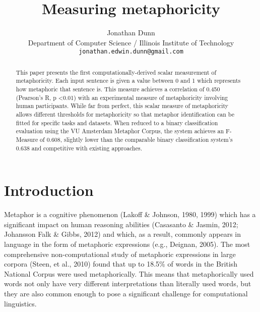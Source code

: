 \documentclass[11pt]{article}
\title{Measuring metaphoricity}
\author{Jonathan Dunn \\
Department of Computer Science / Illinois Institute of Technology \\
  {\tt jonathan.edwin.dunn@gmail.com} \\}
\date{}
\begin{document}
\maketitle
\begin{abstract}
This paper presents the first computationally-derived scalar measurement of metaphoricity. Each input sentence is given a value between 0 and 1 which represents how metaphoric that sentence is. This measure achieves a correlation of 0.450 (Pearson's R,    p \textless  0.01) with an experimental measure of metaphoricity involving human participants. While far from perfect, this scalar measure of metaphoricity allows different thresholds for metaphoricity so that metaphor identification can be fitted for specific tasks and datasets. When reduced to a binary classification evaluation using the VU Amsterdam Metaphor Corpus, the system achieves an F-Measure of 0.608, slightly lower than the comparable binary classification system's 0.638 and competitive with existing approaches.
\end{abstract}

\section{Introduction}

Metaphor is a cognitive phenomenon (Lakoff \& Johnson, 1980, 1999) which has a significant impact on human reasoning abilities (Casasanto \& Jasmin, 2012; Johansson Falk \& Gibbs, 2012) and which, as a result, commonly appears in language in the form of metaphoric expressions (e.g., Deignan, 2005). The most comprehensive non-computational study of metaphoric expressions in large corpora (Steen, et al., 2010) found that up to 18.5\% of words in the British National Corpus were used metaphorically. This means that metaphorically used words not only have very different interpretations than literally used words, but they are also common enough to pose a significant challenge for computational linguistics.
\end{document}
